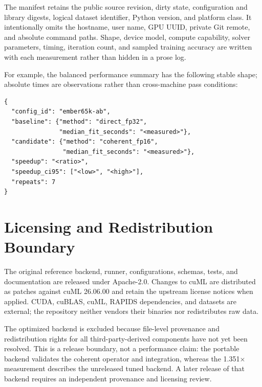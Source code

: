 The manifest retains the public source revision, dirty state, configuration
and library digests, logical dataset identifier, Python version, and platform
class. It intentionally omits the hostname, user name, GPU UUID, private Git
remote, and absolute command paths. Shape, device model, compute capability,
solver parameters, timing, iteration count, and sampled training accuracy are
written with each measurement rather than hidden in a prose log.

For example, the balanced performance summary has the following stable
shape; absolute times are observations rather than cross-machine pass
conditions:

\begin{lstlisting}[style=codeblock]
{
  "config_id": "ember65k-ab",
  "baseline": {"method": "direct_fp32",
               "median_fit_seconds": "<measured>"},
  "candidate": {"method": "coherent_fp16",
                "median_fit_seconds": "<measured>"},
  "speedup": "<ratio>",
  "speedup_ci95": ["<low>", "<high>"],
  "repeats": 7
}
\end{lstlisting}

\section{Licensing and Redistribution Boundary}
\label{app:licensing}

The original reference backend, runner, configurations, schemas, tests, and
documentation are released under Apache-2.0. Changes to cuML are distributed
as patches against cuML 26.06.00 and retain the upstream license notices when
applied. CUDA, cuBLAS, cuML, RAPIDS dependencies, and datasets are external;
the repository neither vendors their binaries nor redistributes raw data.

The optimized  backend is excluded because file-level
provenance and redistribution rights for all third-party-derived components
have not yet been resolved. This is a release boundary, not a performance
claim: the portable backend validates the coherent operator and integration,
whereas the 1.351$\times$ measurement describes the unreleased tuned backend.
A later release of that backend requires an independent provenance and
licensing review.
